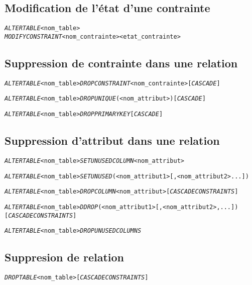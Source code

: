 \documentclass[10pt]{article}
\begin{document}
		\subsection{Modification de l'état d'une contrainte}
			\begin{alltt}
				\emph{ALTER TABLE} <nom_table>
				\emph{MODIFY CONSTRAINT} <nom_contrainte> <etat_contrainte>
			\end{alltt}
			
		\subsection{Suppression de contrainte dans une relation}
			\begin{alltt}
				\emph{ALTER TABLE} <nom_table> \emph{DROP CONSTRAINT} <nom_contrainte> [\emph{CASCADE}]
				
				\emph{ALTER TABLE} <nom_table> \emph{DROP UNIQUE}(<nom_attribut>) [\emph{CASCADE}]
				
				\emph{ALTER TABLE} <nom_table> \emph{DROP PRIMARY KEY} [\emph{CASCADE}]
			\end{alltt}
			
		\subsection{Suppression d'attribut dans une relation}
			\begin{alltt}
				\emph{ALTER TABLE} <nom_table> \emph{SET UNUSED COLUMN} <nom_attribut>
				
				\emph{ALTER TABLE} <nom_table> \emph{SET UNUSED}(<nom_attribut1>[, <nom_attribut2> ...])
				
				\emph{ALTER TABLE} <nom_table> \emph{DROP COLUMN} <nom_attribut> [\emph{CASCADE CONSTRAINTS}]
				
				\emph{ALTER TABLE} <nom_table> \emph{DDROP}(<nom_attribut1>[, <nom_attribut2>, ...]) [\emph{CASCADE CONSTRAINTS}]
				
				\emph{ALTER TABLE} <nom_table> \emph{DROP UNUSED COLUMNS}
			\end{alltt}
			
		\subsection{Suppresion de relation}
			\begin{alltt}
				\emph{DROP TABLE} <nom_table> [\emph{CASCADE CONSTRAINTS}]
			\end{alltt}
			
\end{document}
